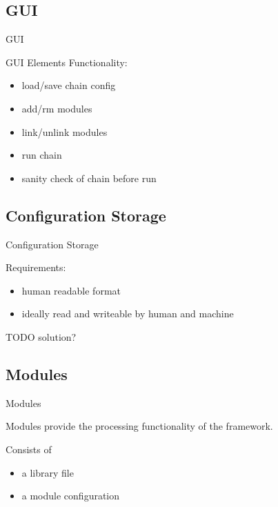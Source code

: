\documentclass{beamer}
\begin{document}
\subsection{GUI}
\begin{frame}{GUI}

	GUI Elements
	Functionality:
	\begin{itemize}
		\item load/save chain config
		\item add/rm modules
 		\item link/unlink modules
  		\item run chain
	 	\item sanity check of chain before run
	\end{itemize}

\end{frame}

\subsection{Configuration Storage}
\begin{frame}{Configuration Storage}

	Requirements:
	\begin{itemize}
		\item human readable format
		\item ideally read and writeable by human and machine
	\end{itemize}

	TODO solution?


\end{frame}

\subsection{Modules}
\begin{frame}{Modules}

	Modules provide the processing functionality of the framework.

	Consists of
	\begin{itemize}
		\item a library file
		\item a module configuration
	\end{itemize}

\end{frame}
\end{document}
